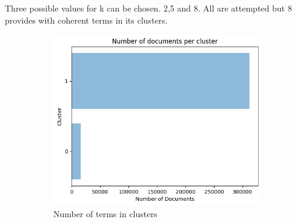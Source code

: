 \documentclass[a4paper, 12pt]{article}
\begin{document}
Three possible values for k can be chosen. 2,5 and 8. All are attempted but 8 provides with coherent terms in its clusters.


\begin{figure}[H]
    \centering
    \begin{subfigure}[a]{0.3\textwidth}
        \includegraphics[width=\textwidth]{res/k2.png}
        \caption{Number of terms in clusters}
    \end{subfigure}
    ~ %
    \begin{subfigure}[b]{0.3\textwidth}

\end{subfigure}
\end{figure}
\end{document}
